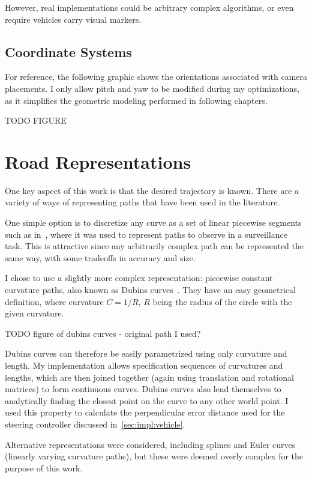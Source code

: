 \documentclass[a4paper,12pt,twoside,openright]{report}
\begin{document}
However, real implementations could be arbitrary complex algorithms,
or even require vehicles carry visual markers.

\subsection{Coordinate Systems}
For reference, the following graphic shows the orientations
associated with camera placements. I only allow pitch and yaw
to be modified during my optimizations, as it simplifies
the geometric modeling performed in following chapters. 

TODO FIGURE


\section{Road Representations}

One key aspect of this work is that the desired trajectory is known.
There are a variety of ways of representing paths that have been
used in the literature.

One simple option is to discretize any curve as a set of linear
piecewise segments such as in~\cite{bodor2007optimal}, where it was used to 
represent paths to observe in a surveillance task. This is attractive
since any arbitrarily complex path can be represented the same way,
with some tradeoffs in accuracy and size. 

I chose to use a slightly more complex representation: piecewise
constant curvature paths, also known as Dubins curves~\cite{dubins1957curves}.
They have an easy geometrical definition, where curvature $C = 1/R$, $R$ 
being the radius of the circle with the given curvature.

TODO figure of dubins curves - original path I used?

Dubins curves can therefore be easily parametrized using only curvature and length.
My implementation allows specification sequences of curvatures and lengths, which are
then joined together (again using translation and rotational matrices) to form
continuous curves. Dubins curves also lend themselves to analytically finding the closest point
on the curve to any other world point. I used this property to calculate
the perpendicular error distance used for the steering controller
discussed in~\ref{sec:impl:vehicle}.

Alternative representations were considered, including splines and
Euler curves (linearly varying curvature paths),
but these were deemed overly complex for the purpose of this work.
\end{document}
